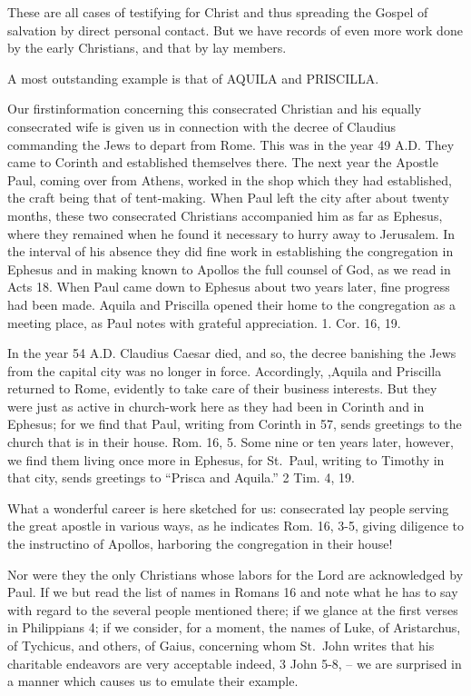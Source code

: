\documentclass[
]{book}
\begin{document}
These are all cases of testifying for Christ and thus spreading the Gospel of salvation by direct personal contact. But we have records of even more work done by the early Christians, and that by lay members.

A most outstanding example is that of AQUILA and PRISCILLA.

Our firstinformation concerning this consecrated Christian and his equally consecrated wife is given us in connection with the decree of Claudius commanding the Jews to depart from Rome. This was in the year 49 A.D. They came to Corinth and established themselves there. The next year the Apostle Paul, coming over from Athens, worked in the shop which they had established, the craft being that of tent-making. When Paul left the city after about twenty months, these two consecrated Christians accompanied him as far as Ephesus, where they remained when he found it necessary to hurry away to Jerusalem. In the interval of his absence they did fine work in establishing the congregation in Ephesus and in making known to Apollos the full counsel of God, as we read in Acts 18. When Paul came down to Ephesus about two years later, fine progress had been made. Aquila and Priscilla opened their home to the congregation as a meeting place, as Paul notes with grateful appreciation. 1. Cor. 16, 19.

In the year 54 A.D. Claudius Caesar died, and so, the decree banishing the Jews from the capital city was no longer in force. Accordingly, ,Aquila and Priscilla returned to Rome, evidently to take care of their business interests. But they were just as active in church-work here as they had been in Corinth and in Ephesus; for we find that Paul, writing from Corinth in 57, sends greetings to the church that is in their house. Rom. 16, 5. Some nine or ten years later, however, we find them living once more in Ephesus, for St.~Paul, writing to Timothy in that city, sends greetings to ``Prisca and Aquila.'' 2 Tim. 4, 19.

What a wonderful career is here sketched for us: consecrated lay people serving the great apostle in various ways, as he indicates Rom. 16, 3-5, giving diligence to the instructino of Apollos, harboring the congregation in their house!

Nor were they the only Christians whose labors for the Lord are acknowledged by Paul. If we but read the list of names in Romans 16 and note what he has to say with regard to the several people mentioned there; if we glance at the first verses in Philippians 4; if we consider, for a moment, the names of Luke, of Aristarchus, of Tychicus, and others, of Gaius, concerning whom St.~John writes that his charitable endeavors are very acceptable indeed, 3 John 5-8, -- we are surprised in a manner which causes us to emulate their example.
\end{document}
